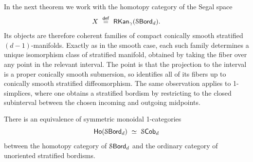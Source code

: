 \begin{remark}\label{ch5:: rmk: homotopy ehresmann strat}
    In the next theorem we work with the homotopy category of the Segal space
    \begin{equation}
        X \,\, \overset{\sf def}{=} \,\, \mathsf{RKan}_{\gamma}(\operatorname{\mathcal S\mathsf{Bord}}_d).
    \end{equation}
    Its objects are therefore coherent families of compact conically smooth stratified $(d-1)$-manifolds. Exactly as in the smooth case, each such family determines a unique isomorphism class of stratified manifold, obtained by taking the fiber over any point in the relevant interval. The point is that the projection to the interval is a proper conically smooth submersion, so  identifies all of its fibers up to conically smooth stratified diffeomorphism. The same observation applies to 1-simplices, where one obtains a stratified bordism by restricting to the closed subinterval between the chosen incoming and outgoing midpoints.
\end{remark}

\begin{theorem}\label{ch5:: thm: homotopy category stratified bord}
    There is an equivalence of symmetric monoidal 1-categories
    \begin{equation}
        \operatorname{\sf Ho}(\operatorname{\mathcal S\mathsf{Bord}}_d) \,\, \simeq \,\, \mathcal S\mathsf{Cob}_d
    \end{equation}
    between the homotopy category of $\operatorname{\mathcal S\mathsf{Bord}}_d$ and the ordinary category of unoriented stratified bordisms.
\end{theorem}

